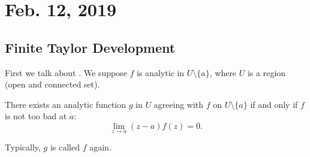 \section{Feb. 12, 2019}

\subsection{Finite Taylor Development}

First we talk about .
We suppose $f$ is analytic in $U \setminus \{a\}$,
where $U$ is a region (open and connected set).

\begin{theorem}
    There exists an analytic function $g$ in $U$ agreeing with $f$
    on $U \setminus \{ a \}$ if and only if $f$ is not too bad
    at $a$:
    \[ \lim_{z \to a} (z-a)f(z) = 0. \]
\end{theorem}

Typically, $g$ is called $f$ again.

